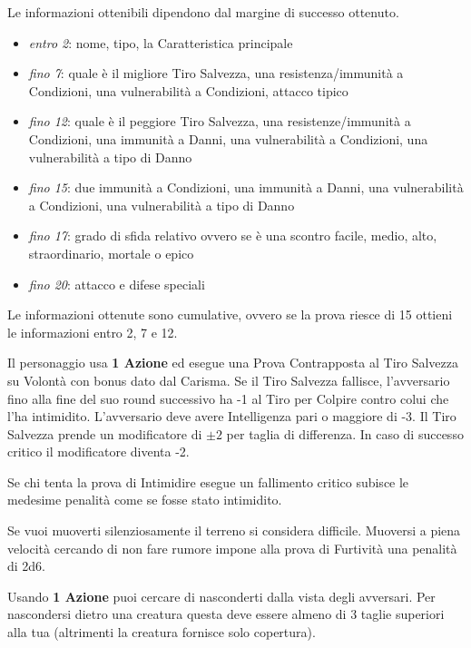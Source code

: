 \documentclass[landscape,10pt,a4paper]{article}
\begin{document}
\begin{multicols}{3}
\begin{dmbox}[title=Riconoscere i mostri]
Le informazioni ottenibili dipendono dal margine di successo ottenuto. 

\noindent\begin{itemize}\setlength{\itemsep}{0pt}
	\item \emph{entro 2}: nome, tipo, la Caratteristica principale
	\item \emph{fino 7}: quale è il migliore Tiro Salvezza, una resistenza/immunità a Condizioni, una vulnerabilità a Condizioni, attacco tipico
	\item \emph{fino 12}: quale è il peggiore Tiro Salvezza, una resistenze/immunità a Condizioni, una immunità a Danni, una vulnerabilità a Condizioni, una vulnerabilità a tipo di Danno
	\item \emph{fino 15}: due immunità a Condizioni, una immunità a Danni, una vulnerabilità a Condizioni, una vulnerabilità a tipo di Danno
	\item \emph{fino 17}: grado di sfida relativo ovvero se è una scontro facile, medio, alto, straordinario, mortale o epico
	\item \emph{fino 20}: attacco e difese speciali
\end{itemize}

\medskip

Le informazioni ottenute sono cumulative, ovvero se la prova riesce di 15 ottieni le informazioni entro 2, 7 e 12.
\end{dmbox}		


\begin{dmbox}[title=Intimidire]	
Il personaggio usa \textbf{1 Azione} ed esegue una Prova Contrapposta al Tiro Salvezza su Volontà con bonus dato dal Carisma.
Se il Tiro Salvezza fallisce, l'avversario fino alla fine del suo round successivo ha -1 al Tiro per Colpire contro colui che l'ha intimidito. L'avversario deve avere Intelligenza pari o maggiore di -3. Il Tiro Salvezza prende un modificatore di $\pm2$ per taglia di differenza. In caso di successo critico il modificatore diventa -2. 

Se chi tenta la prova di Intimidire esegue un fallimento critico subisce le medesime penalità come se fosse stato intimidito.
\end{dmbox}		


\begin{dmbox}[title=Furtività]	
Se vuoi muoverti silenziosamente il terreno si considera difficile. Muoversi a piena velocità cercando di non fare rumore impone alla prova di Furtività una penalità di 2d6.

Usando \textbf{1 Azione} puoi cercare di nasconderti dalla vista degli avversari. Per nascondersi dietro una creatura questa deve essere almeno di 3 taglie superiori alla tua (altrimenti la creatura fornisce solo copertura).
\end{dmbox}		


\end{multicols}
\end{document}
